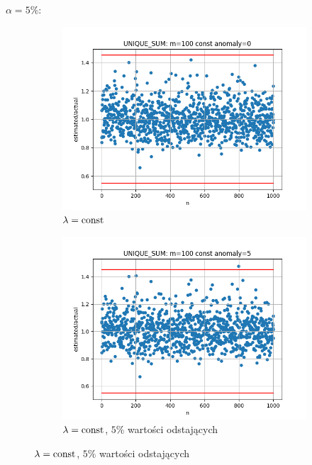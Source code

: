 \documentclass{article}
\begin{document}
    $\alpha = 5\%$:
        
    \begin{figure}[H]
        \begin{subfigure}{0.6\textwidth}
            \centering
            \includegraphics[width=\linewidth]{sum/zad1_const_0_cheb_5.png}
            \caption{$\lambda = \textnormal{const}$}
        \end{subfigure}
        \begin{subfigure}{0.6\textwidth}
            \centering
            \includegraphics[width=\linewidth]{sum/zad1_const_5_cheb_5.png}
            \caption{$\lambda = \textnormal{const}$, $5\%$ wartości odstających}
        \end{subfigure}

\end{figure}
\end{document}
